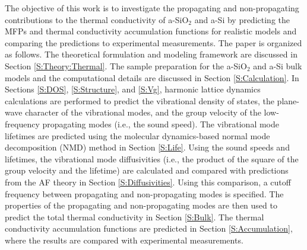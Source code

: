 \documentclass[aps,prb,twocolumn,superscriptaddress,footinbib,amsmath,amssymb,floatfix]{revtex4}
\begin{document}
The objective of this work is to investigate the propagating 
and non-propagating contributions to the thermal conductivity 
of a-SiO$_2$ and a-Si   
by predicting the MFPs and thermal conductivity 
accumulation functions for realistic models and comparing the 
predictions to experimental measurements. 
The paper is organized as follows. 
The theoretical formulation and modeling framework are 
discussed in Section \ref{S:Theory:Thermal}. The sample preparation 
for the a-SiO$_2$ and a-Si bulk models and the computational details 
are discussed in Section \ref{S:Calculation}. 
In Sections \ref{S:DOS}, \ref{S:Structure}, and \ref{S:Vg}, 
harmonic lattice dynamics calculations 
are performed to predict the vibrational density of 
states, the plane-wave character of the vibrational modes, and  
the group velocity of the low-frequency propagating modes (i.e., 
the sound speed). 
The vibrational mode lifetimes are predicted using the
molecular dynamics-based normal 
mode decomposition (NMD) method in Section \ref{S:Life}. 
Using the sound speeds and lifetimes, the vibrational 
mode diffusivities (i.e., the product of the square of 
the group velocity and the lifetime) are calculated and compared 
with predictions from the AF theory in Section \ref{S:Diffusivities}. 
Using this comparison, a cutoff frequency between propagating and 
non-propagating modes is specified. 
The properties of the propagating and non-propagating 
modes are then used to predict the total thermal 
conductivity in Section \ref{S:Bulk}. 
The thermal conductivity accumulation functions 
are predicted in Section \ref{S:Accumulation}, 
where the results are compared with experimental measurements. 

\end{document}

